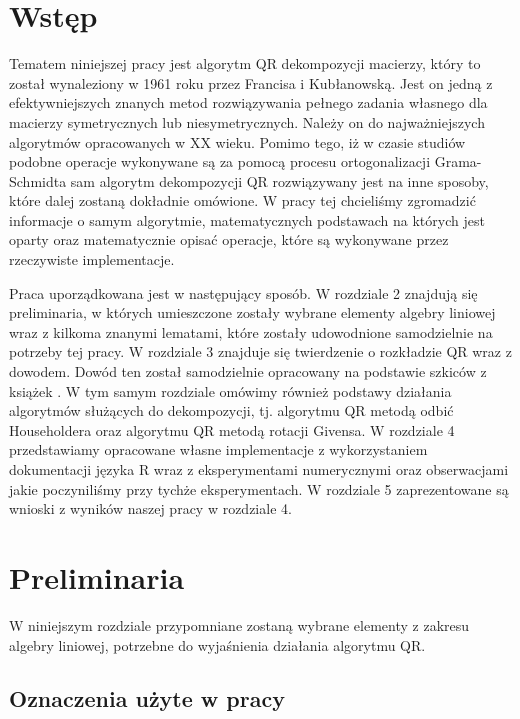 \documentclass[12pt,a4paper]{report}
\begin{document}
\chapter{Wstęp}
Tematem niniejszej pracy jest algorytm QR dekompozycji macierzy, który to został wynaleziony w 1961 roku przez Francisa i Kubłanowską. Jest on jedną z efektywniejszych znanych metod rozwiązywania pełnego zadania własnego dla macierzy symetrycznych lub niesymetrycznych. Należy on do najważniejszych algorytmów opracowanych w XX wieku. Pomimo tego, iż w czasie studiów podobne operacje wykonywane są za pomocą procesu ortogonalizacji Grama-Schmidta sam algorytm dekompozycji QR rozwiązywany jest na inne sposoby, które dalej zostaną dokładnie omówione. W pracy tej chcieliśmy zgromadzić informacje o samym algorytmie, matematycznych podstawach na których jest oparty oraz matematycznie opisać operacje, które są wykonywane przez rzeczywiste implementacje.

Praca uporządkowana jest w następujący sposób. W rozdziale 2 znajdują się preliminaria, w których umieszczone zostały wybrane elementy algebry liniowej wraz z kilkoma znanymi lematami, które zostały udowodnione samodzielnie na potrzeby tej pracy. W rozdziale 3 znajduje się twierdzenie o rozkładzie QR wraz z dowodem. Dowód ten został samodzielnie opracowany na podstawie szkiców z książek \citep{bjorck14,demmel12,poreda11,wilkinson13}. W tym samym rozdziale omówimy również podstawy działania algorytmów służących do dekompozycji, tj. algorytmu QR metodą odbić Householdera oraz algorytmu QR metodą rotacji Givensa. W rozdziale 4 przedstawiamy opracowane własne implementacje z wykorzystaniem dokumentacji języka R \citep{dokumentacjaR} wraz z eksperymentami numerycznymi oraz obserwacjami jakie poczyniliśmy przy tychże eksperymentach. W rozdziale 5 zaprezentowane są wnioski z wyników naszej pracy w rozdziale 4. 










\chapter{Preliminaria}

W niniejszym rozdziale przypomniane zostaną wybrane elementy z zakresu algebry liniowej, potrzebne do wyjaśnienia działania algorytmu QR. 
 
\section{Oznaczenia użyte w pracy}
\end{document}

